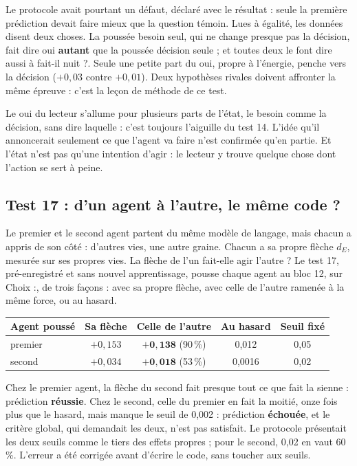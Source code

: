 \documentclass[fontsize=10pt,paper=a4,parskip=half-]{scrartcl}
\newcommand{\q}[1]{\og #1\fg{}}
\newcommand{\pc}{\,\%}
\begin{document}
Le protocole avait pourtant un défaut, déclaré avec le résultat : seule la première
prédiction devait faire mieux que la question témoin. Lues à égalité, les données disent
deux choses. La poussée \q{besoin seul}, qui ne change presque pas la décision, fait dire
\q{oui} \textbf{autant} que la poussée \q{décision seule} ; et toutes deux le font dire
aussi à \q{fait-il nuit ?}. Seule une petite part du \q{oui}, propre à l'énergie, penche
vers la décision ($+0,03$ contre $+0,01$). Deux hypothèses rivales doivent affronter la même épreuve :
c'est la leçon de méthode de ce test.

\begin{essentiel}
Le \q{oui} du lecteur s'allume pour plusieurs parts de l'état, le besoin comme la
décision, sans dire laquelle : c'est toujours l'aiguille du test 14. L'idée qu'il
annoncerait seulement ce que l'agent va faire n'est confirmée qu'en partie. Et l'état n'est
pas qu'une intention d'agir : le lecteur y trouve quelque chose dont l'action se sert à peine.
\end{essentiel}

\subsection{Test 17 : d'un agent à l'autre, le même code ?}
Le premier et le second agent partent du même modèle de langage, mais chacun a appris de
son côté : d'autres vies, une autre graine. Chacun a sa propre flèche $d_E$, mesurée sur
ses propres vies. La flèche de l'un fait-elle agir l'autre ? Le test 17, pré-enregistré et
sans nouvel apprentissage, pousse chaque agent au bloc 12, sur \q{Choix :}, de trois
façons : avec sa propre flèche, avec celle de l'autre ramenée à la même force, ou au
hasard.

\begin{center}\small
\begin{tabular}{lcccc}
\toprule
\textsf{Agent poussé} & \textsf{Sa flèche} & \textsf{Celle de l'autre} & \textsf{Au hasard} & \textsf{Seuil fixé}\\
\midrule
premier & $+0,153$ & $\mathbf{+0,138}$ \enspace(90\pc) & 0,012 & 0,05\\
second & $+0,034$ & $\mathbf{+0,018}$ \enspace(53\pc) & 0,0016 & 0,02\\
\bottomrule
\end{tabular}
\end{center}

Chez le premier agent, la flèche du second fait presque tout ce que fait la sienne :
prédiction \textbf{réussie}. Chez le second, celle du premier en fait la moitié, onze fois
plus que le hasard, mais manque le seuil de 0,002 : prédiction \textbf{échouée}, et le
critère global, qui demandait les deux, n'est pas satisfait. Le protocole présentait les
deux seuils comme \q{le tiers} des effets propres ; pour le second, 0,02 en vaut 60\pc.
L'erreur a été corrigée avant d'écrire le code, sans toucher aux seuils.
\end{document}
